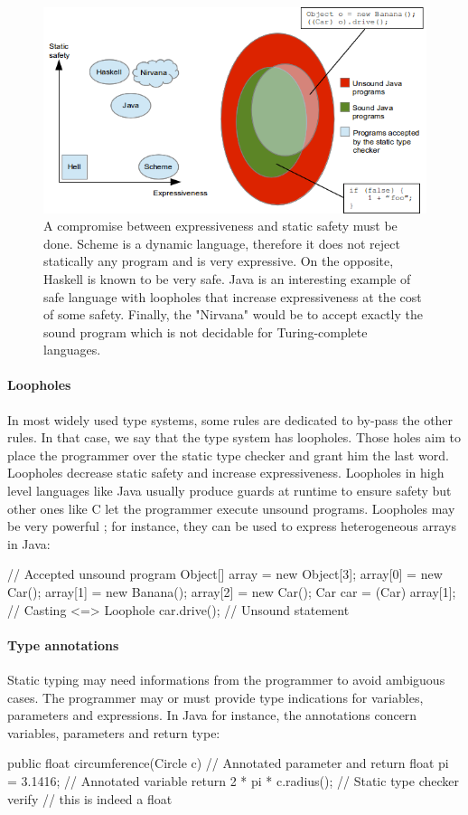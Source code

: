 \documentclass[a4paper]{report}
\begin{document}
\begin{figure}
\centering
\includegraphics{images/express_safety.png}
\caption{A compromise between expressiveness and static safety must be done. Scheme is a dynamic language, therefore it does not reject statically any program and is very expressive. On the opposite, Haskell is known to be very safe. Java is an interesting example of safe language with loopholes that increase expressiveness at the cost of some safety. Finally, the "Nirvana" would be to accept exactly the sound program which is not decidable for Turing-complete languages.}
\label{express_safety}
\end{figure}

\paragraph{Loopholes} In most widely used type systems, some rules are dedicated to by-pass the other rules. In that case, we say that the type system has loopholes. Those holes aim to place the programmer over the static type checker and grant him the last word. Loopholes decrease static safety and increase expressiveness. Loopholes in high level languages like Java usually produce guards at runtime to ensure safety but other ones like C let the programmer execute unsound programs. Loopholes may be very powerful ; for instance, they can be used to express heterogeneous arrays in Java:
\begin{java}
// Accepted unsound program
Object[] array = new Object[3];
array[0] = new Car();
array[1] = new Banana();
array[2] = new Car();
Car car = (Car) array[1];       //  Casting <=> Loophole
car.drive();                    // Unsound statement
\end{java}

\paragraph{Type annotations} Static typing may need informations from the programmer to avoid ambiguous cases. The programmer may or must provide type indications for variables, parameters and expressions. In Java for instance, the annotations concern variables, parameters and return type:
\begin{java}
public float circumference(Circle c) { // Annotated parameter and return
	float pi = 3.1416;                 // Annotated variable
	return 2 * pi * c.radius();        // Static type checker verify
}                                      // this is indeed a float
\end{java}
\end{document}

